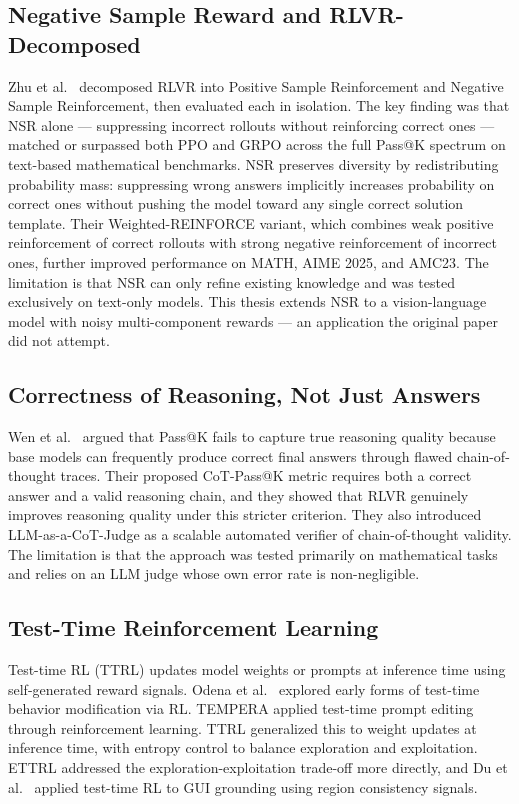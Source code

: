 \documentclass{iutbscthesis}
\begin{document}
\subsection{Negative Sample Reward and RLVR-Decomposed}

Zhu et al.\ \cite{zhu2025rlvrdecomposed} decomposed RLVR into Positive Sample Reinforcement and Negative Sample Reinforcement, then evaluated each in isolation. The key finding was that NSR alone --- suppressing incorrect rollouts without reinforcing correct ones --- matched or surpassed both PPO and GRPO across the full Pass@K spectrum on text-based mathematical benchmarks. NSR preserves diversity by redistributing probability mass: suppressing wrong answers implicitly increases probability on correct ones without pushing the model toward any single correct solution template. Their Weighted-REINFORCE variant, which combines weak positive reinforcement of correct rollouts with strong negative reinforcement of incorrect ones, further improved performance on MATH, AIME 2025, and AMC23. The limitation is that NSR can only refine existing knowledge and was tested exclusively on text-only models. This thesis extends NSR to a vision-language model with noisy multi-component rewards --- an application the original paper did not attempt.

\subsection{Correctness of Reasoning, Not Just Answers}

Wen et al.\ \cite{wen2025rlvr} argued that Pass@K fails to capture true reasoning quality because base models can frequently produce correct final answers through flawed chain-of-thought traces. Their proposed CoT-Pass@K metric requires both a correct answer and a valid reasoning chain, and they showed that RLVR genuinely improves reasoning quality under this stricter criterion. They also introduced LLM-as-a-CoT-Judge as a scalable automated verifier of chain-of-thought validity. The limitation is that the approach was tested primarily on mathematical tasks and relies on an LLM judge whose own error rate is non-negligible.

\subsection{Test-Time Reinforcement Learning}

Test-time RL (TTRL) updates model weights or prompts at inference time using self-generated reward signals. Odena et al.\ \cite{odena2017testtime} explored early forms of test-time behavior modification via RL. TEMPERA \cite{zhang2023tempera} applied test-time prompt editing through reinforcement learning. TTRL \cite{zuo2025ttrl} generalized this to weight updates at inference time, with entropy control to balance exploration and exploitation. ETTRL \cite{liu2025ettrl} addressed the exploration-exploitation trade-off more directly, and Du et al.\ \cite{du2025testtime} applied test-time RL to GUI grounding using region consistency signals.
\end{document}

